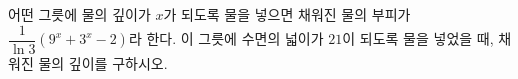 어떤 그릇에 물의 깊이가 $x$가 되도록 물을 넣으면 채워진 물의 부피가 $\dfrac{1}{\ln 3}(9^x+3^x-2)$라 한다. 이 그릇에 수면의 넓이가 $21$이 되도록 물을 넣었을 때, 채워진 물의 깊이를 구하시오.
